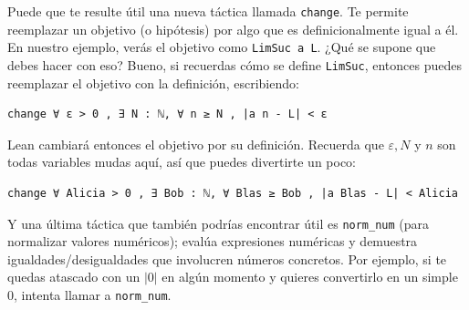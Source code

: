 Puede que te resulte útil una nueva táctica llamada \texttt{change}. Te
permite reemplazar un objetivo (o hipótesis) por algo que es
definicionalmente igual a él. En nuestro ejemplo, verás el objetivo como
\texttt{LimSuc a L}. ¿Qué se supone que debes hacer con eso? Bueno, si
recuerdas cómo se define \texttt{LimSuc}, entonces puedes reemplazar el
objetivo con la definición, escribiendo:

\begin{verbatim}
change ∀ ε > 0 , ∃ N : ℕ, ∀ n ≥ N , |a n - L| < ε
\end{verbatim}

Lean cambiará entonces el objetivo por su definición. Recuerda que
$\varepsilon, N$ y $n$ son todas variables mudas aquí, así que puedes divertirte
un poco:

\begin{verbatim}
change ∀ Alicia > 0 , ∃ Bob : ℕ, ∀ Blas ≥ Bob , |a Blas - L| < Alicia
\end{verbatim}

Y una última táctica que también podrías encontrar útil es
\texttt{norm\_num} (para normalizar valores numéricos); evalúa
expresiones numéricas y demuestra igualdades/desigualdades que
involucren números concretos. Por ejemplo, si te quedas atascado con un
$|0|$ en algún momento y quieres convertirlo en un simple $0$, intenta
llamar a \texttt{norm\_num}.

